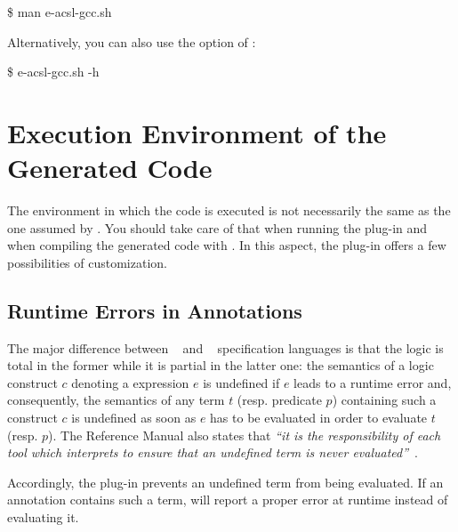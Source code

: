 \begin{shell}
\$ man e-acsl-gcc.sh
\end{shell}

Alternatively, you can also use the  option of \eacslgcc:

\begin{shell}
\$ e-acsl-gcc.sh -h
\end{shell}

\section{Execution Environment of the Generated Code} %
\label{sec:exec-env}

The environment in which the code is executed is not necessarily the same as
the one assumed by \framac. You should take care of that when running the \eacsl
plug-in and when compiling the generated code with \gcc. In this aspect, the
plug-in offers a few possibilities of customization.


\subsection{Runtime Errors in Annotations}
\label{sec:runtime-error}

The major difference between \acsl~\cite{acsl} and \eacsl~\cite{eacsl}
specification languages is that the logic is total in the former while it is
partial in the latter one: the semantics of a logic construct $c$ denoting a \C
expression $e$
is undefined if $e$ leads to a runtime error and, consequently, the semantics of
any term $t$ (resp. predicate $p$) containing such a construct $c$ is
undefined as soon as $e$ has to be evaluated in order to evaluate $t$
(resp. $p$). The \eacsl Reference Manual also states that \emph{``it is the
  responsibility of each tool which interprets \eacsl to ensure that an
  undefined term is never evaluated''}~\cite{eacsl}.

Accordingly, the \eacsl plug-in prevents an undefined term from being
evaluated. If an annotation contains such a term, \eacsl will report a proper
error at runtime instead of evaluating it.

